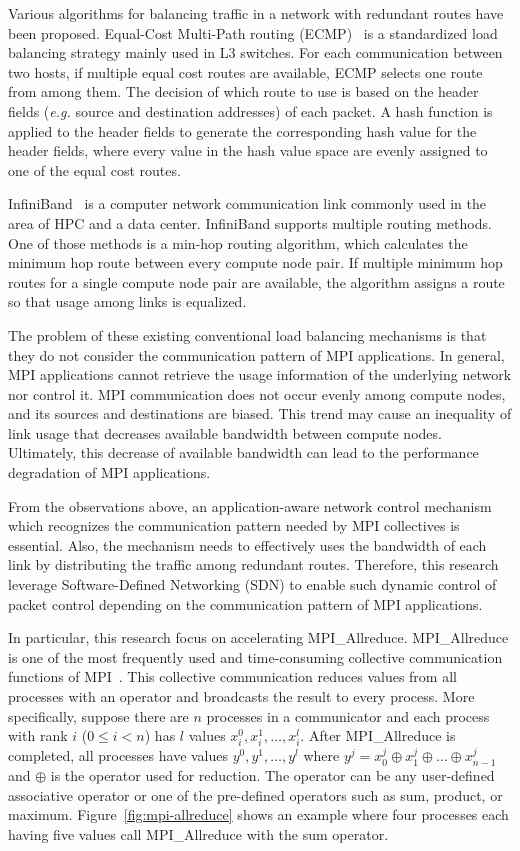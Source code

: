 Various algorithms for balancing traffic in a network with redundant
routes have been proposed. Equal-Cost Multi-Path routing (ECMP)~\autocite{ecmp} is
a standardized load balancing strategy mainly used in L3 switches. For each
communication between two hosts, if multiple equal cost routes are available,
ECMP selects one route from among them. The decision of which route to use is
based on the header fields (\emph{e.g.} source and destination addresses) of
each packet. A hash function is applied to the header fields to generate the
corresponding hash value for the header fields, where every value in the hash
value space are evenly assigned to one of the equal cost routes.

InfiniBand~\autocite{Buyya2009} is a computer network communication link
commonly used in the area of HPC and a data center. InfiniBand supports
multiple routing methods. One of those methods is a min-hop routing
algorithm, which calculates the minimum hop route between every
compute node pair. If multiple minimum hop routes for a single
compute node pair are available, the algorithm assigns a route so that
usage among links is equalized.

The problem of these existing conventional load balancing mechanisms is
that they do not consider the communication pattern of MPI
applications. In general, MPI applications cannot retrieve the usage
information of the underlying network nor control it. MPI communication does
not occur evenly among compute nodes, and its sources and destinations are
biased. This trend may cause an inequality of link usage that decreases
available bandwidth between compute nodes. Ultimately, this decrease of
available bandwidth can lead to the performance degradation of MPI
applications.

From the observations above, an application-aware network control mechanism
which recognizes the communication pattern needed by MPI collectives is
essential. Also, the mechanism needs to effectively uses the bandwidth of each
link by distributing the traffic among redundant routes. Therefore, this
research leverage Software-Defined Networking (SDN) to enable such dynamic
control of packet control depending on the communication pattern of MPI
applications.

In particular, this research focus on accelerating MPI\_Allreduce.
MPI\_Allreduce is one of the most frequently used and time-consuming
collective communication functions of MPI\@~\cite{Chunduri2018}.
This collective communication reduces values from all
processes with an operator and broadcasts the result to every process.
More specifically, suppose there are $n$ processes in a communicator and
each process with rank $i$ ($0 \leq i < n$) has $l$ values $x_i^0, x_i^1,
\dots, x_i^l$. After MPI\_Allreduce is completed, all processes have values
$y^0, y^1, \dots, y^l$ where $y^j = x_0^j \oplus x_1^j \oplus \dots \oplus
x_{n-1}^j$ and $\oplus$ is the operator used for reduction. The operator can
be any user-defined associative operator or one of the pre-defined operators
such as sum, product, or maximum. Figure~\ref{fig:mpi-allreduce} shows an
example where four processes each having five values call MPI\_Allreduce with
the sum operator.

